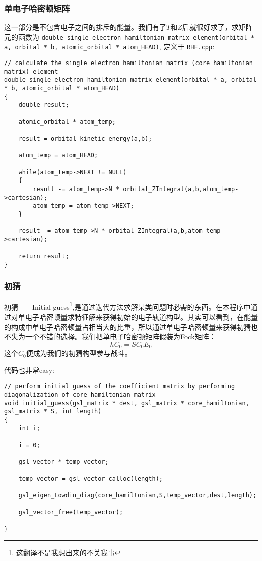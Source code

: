 \documentclass[12pt,a4paper,openany,twoside]{article}
\numberwithin{equation}{section}
\begin{document}
                \subsubsection{单电子哈密顿矩阵}
                这一部分是不包含电子之间的排斥的能量。我们有了$T$和$Z$后就很好求了，求矩阵元的函数为 \lstinline$double single_electron_hamiltonian_matrix_element(orbital * a, orbital * b, atomic_orbital * atom_HEAD)$, 定义于 \lstinline$RHF.cpp$:
                \begin{lstlisting}
// calculate the single electron hamiltonian matrix (core hamiltonian matrix) element
double single_electron_hamiltonian_matrix_element(orbital * a, orbital * b, atomic_orbital * atom_HEAD)
{
    double result;

    atomic_orbital * atom_temp;

    result = orbital_kinetic_energy(a,b);

    atom_temp = atom_HEAD;
    
    while(atom_temp->NEXT != NULL)
    {
        result -= atom_temp->N * orbital_ZIntegral(a,b,atom_temp->cartesian);
        atom_temp = atom_temp->NEXT;
    }

    result -= atom_temp->N * orbital_ZIntegral(a,b,atom_temp->cartesian);

    return result;
}
                \end{lstlisting}
                \subsubsection{初猜}
                初猜——Initial guess\footnote{这翻译不是我想出来的不关我事},是通过迭代方法求解某类问题时必需的东西。在本程序中通过对单电子哈密顿量求特征解来获得初始的电子轨道构型。其实可以看到，在能量的构成中单电子哈密顿量占相当大的比重，所以通过单电子哈密顿量来获得初猜也不失为一个不错的选择。我们把单电子哈密顿矩阵假装为Fock矩阵：
                \begin{equation}
                    h C_0 = S C_0 E_0
                \end{equation}
                这个$C_0$便成为我们的初猜构型参与战斗。

                代码也非常easy:
                \begin{lstlisting}
// perform initial guess of the coefficient matrix by performing diagonalization of core hamiltonian matrix
void initial_guess(gsl_matrix * dest, gsl_matrix * core_hamiltonian, gsl_matrix * S, int length)
{
    int i;

    i = 0;

    gsl_vector * temp_vector;

    temp_vector = gsl_vector_calloc(length);

    gsl_eigen_Lowdin_diag(core_hamiltonian,S,temp_vector,dest,length);

    gsl_vector_free(temp_vector);

}
                \end{lstlisting}
\end{document}
